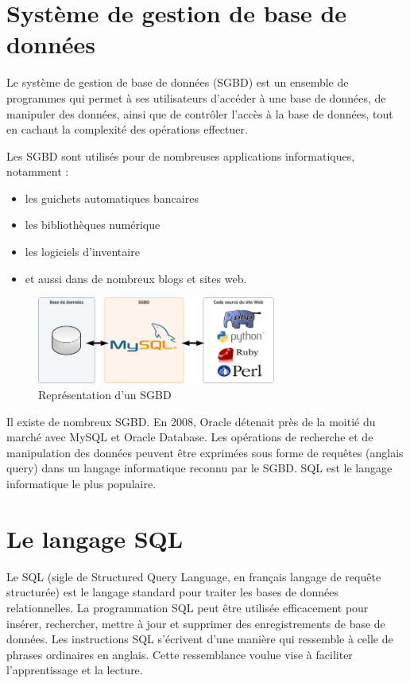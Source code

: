 \documentclass[oneside,13pt,a4paper]{report}
\begin{document}
\section{Système de gestion de base de données}
\label{sgbd}
Le système de gestion de base de données (SGBD) est un ensemble de programmes qui permet à ses utilisateurs d'accéder à une base de données,
de manipuler des données, ainsi que de contrôler l'accès à la base de données, tout en cachant la complexité des opérations effectuer.

Les SGBD sont utilisés pour de nombreuses applications informatiques, notamment :
\begin{itemize}
	\item les guichets automatiques bancaires
	\item les bibliothèques numérique
	\item les logiciels d'inventaire
	\item et aussi dans de nombreux blogs et sites web.
\end{itemize}


\begin{figure}[h]
	\centering
	\includegraphics[width=0.7\textwidth]{img/sgbd.png}
	\caption{Représentation d'un SGBD}
\end{figure}

Il existe de nombreux SGBD. En 2008, Oracle détenait près de la moitié du marché avec MySQL et Oracle Database.
Les opérations de recherche et de manipulation des données peuvent être exprimées sous forme de requêtes (anglais query)
dans un langage informatique reconnu par le SGBD. SQL est le langage informatique le plus populaire.

\section{Le langage SQL}
\label{sql}

Le SQL (sigle de Structured Query Language, en français langage de requête structurée) est le langage standard pour traiter les bases de données relationnelles.
La programmation SQL peut être utilisée efficacement pour insérer, rechercher, mettre à jour et supprimer des enregistrements de base de données.
Les instructions SQL s'écrivent d'une manière qui ressemble à celle de phrases ordinaires en anglais. Cette ressemblance voulue vise à faciliter l'apprentissage et la lecture.
\end{document}
